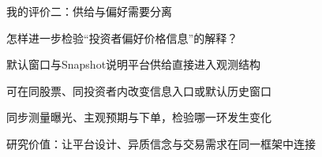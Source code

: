 \documentclass[11pt,compress]{beamer}
\begin{document}
\begin{frame}{我的评价二：供给与偏好需要分离}\relax
{\small\color{tsinghua}怎样进一步检验“投资者偏好价格信息”的解释？\par}\medskip
默认窗口与Snapshot说明平台供给直接进入观测结构\par\medskip
可在同股票、同投资者内改变信息入口或默认历史窗口\par\medskip
同步测量曝光、主观预期与下单，检验哪一环发生变化\par\medskip
研究价值：让平台设计、异质信念与交易需求在同一框架中连接\par\medskip
{}
\end{frame}
\end{document}
